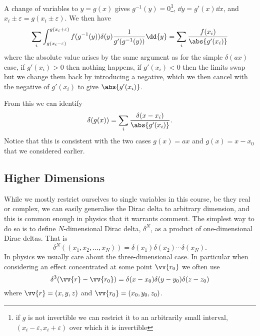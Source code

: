 \documentclass[fleqn]{NotesClass}
\begin{document}
    A change of variables to \(y = g(x)\) gives \(g^{-1}(y) = 0\)\footnote{if \(g\) is not invertible we can restrict it to an arbitrarily small interval, \((x_i - \varepsilon, x_i + \varepsilon)\) over which it is invertible}, \(\dd{y} = g'(x)\dd{x}\), and \(x_i \pm \varepsilon = g(x_i \pm \varepsilon)\).
    We then have
    \begin{equation}
        \sum_{i} \int_{g(x_i - \varepsilon)}^{g(x_i + \varepsilon)} f(g^{-1}(y))\delta(y)\frac{1}{g'(g^{-1}(y))} \dd{y} = \sum_{i} \frac{f(x_i)}{\abs{g'(x_i)}}
    \end{equation}
    where the absolute value arises by the same argument as for the simple \(\delta(ax)\) case, if \(g'(x_i) > 0\) then nothing happens, if \(g'(x_i) < 0\) then the limits swap but we change them back by introducing a negative, which we then cancel with the negative of \(g'(x_i)\) to give \(\abs{g'(x_i)}\).
    
    From this we can identify
    \begin{equation}
        \delta(g(x)) = \sum_{i} \frac{\delta(x - x_i)}{\abs{g'(x_i)}}.
    \end{equation}
    Notice that this is consistent with the two cases \(g(x) = ax\) and \(g(x) = x - x_0\) that we considered earlier.
    
    \subsection{Higher Dimensions}
    While we mostly restrict ourselves to single variables in this course, be they real or complex, we can easily generalise the Dirac delta to arbitrary dimension, and this is common enough in physics that it warrants comment.
    The simplest way to do so is to define \(N\)-dimensional Dirac delta, \(\delta^{N}\), as a product of one-dimensional Dirac deltas.
    That is
    \begin{equation}
        \delta^N((x_1, x_2, \dotsc, x_N)) = \delta(x_1)\delta(x_2)\dotsm \delta(x_N).
    \end{equation}
    In physics we usually care about the three-dimensional case.
    In particular when considering an effect concentrated at some point \(\vv{r_0}\) we often use
    \begin{equation}
        \delta^3(\vv{r} - \vv{r_0}) = \delta(x - x_0)\delta(y - y_0)\delta(z - z_0)
    \end{equation}
    where \(\vv{r} = (x, y, z)\) and \(\vv{r_0} = (x_0, y_0, z_0)\).
    
\end{document}
